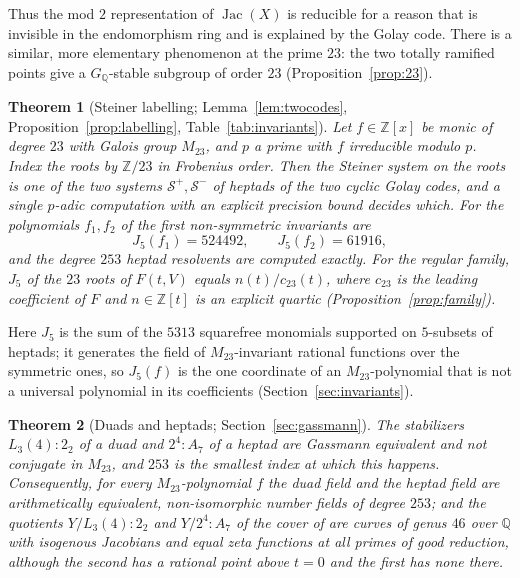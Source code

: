 \documentclass[11pt]{amsart}
\newtheorem{maintheorem}{Theorem}
\theoremstyle{definition}
\newcommand{\QQ}{\mathbb{Q}}
\newcommand{\ZZ}{\mathbb{Z}}
\newcommand{\Jac}{\operatorname{Jac}}
\newcommand{\M}{M_{23}}
\newcommand{\cS}{\mathcal{S}}
\newcommand{\GQ}{G_{\QQ}}
\begin{document}
Thus the mod $2$ representation of $\Jac(X)$ is reducible for a reason that is invisible in the endomorphism ring and is explained by the Golay code. There is a similar, more elementary phenomenon at the prime $23$: the two totally ramified points give a $\GQ$-stable subgroup of order $23$ (Proposition~\ref{prop:23}).

\begin{maintheorem}[Steiner labelling; Lemma~\ref{lem:twocodes}, Proposition~\ref{prop:labelling}, Table~\ref{tab:invariants}]\label{thmC}
Let $f\in\ZZ[x]$ be monic of degree $23$ with Galois group $\M$, and $p$ a prime with $f$ irreducible modulo $p$. Index the roots by $\ZZ/23$ in Frobenius order. Then the Steiner system on the roots is one of the two systems $\cS^{+},\cS^{-}$ of heptads of the two cyclic Golay codes, and a single $p$-adic computation with an explicit precision bound decides which. For the polynomials $f_1,f_2$ of \cite[Examples 1.2, 3.17]{HJLPPZ26} the first non-symmetric invariants are
\[
J_5(f_1)=524492,\qquad J_5(f_2)=61916 ,
\]
and the degree $253$ heptad resolvents are computed exactly. For the regular family, $J_5$ of the $23$ roots of $F(t,V)$ equals $n(t)/c_{23}(t)$, where $c_{23}$ is the leading coefficient of $F$ and $n\in\ZZ[t]$ is an explicit quartic (Proposition~\ref{prop:family}).
\end{maintheorem}

Here $J_5$ is the sum of the $5313$ squarefree monomials supported on $5$-subsets of heptads; it generates the field of $\M$-invariant rational functions over the symmetric ones, so $J_5(f)$ is the one coordinate of an $\M$-polynomial that is not a universal polynomial in its coefficients (Section~\ref{sec:invariants}).

\begin{maintheorem}[Duads and heptads; Section~\ref{sec:gassmann}]\label{thmD}
The stabilizers $L_3(4){:}2_2$ of a duad and $2^4{:}A_7$ of a heptad are Gassmann equivalent and not conjugate in $\M$, and $253$ is the smallest index at which this happens. Consequently, for every $\M$-polynomial $f$ the duad field and the heptad field are arithmetically equivalent, non-isomorphic number fields of degree $253$; and the quotients $Y/L_3(4){:}2_2$ and $Y/2^4{:}A_7$ of the cover of \cite{HJLPPZ26} are curves of genus $46$ over $\QQ$ with isogenous Jacobians and equal zeta functions at all primes of good reduction, although the second has a rational point above $t=0$ and the first has none there.
\end{maintheorem}
\end{document}
